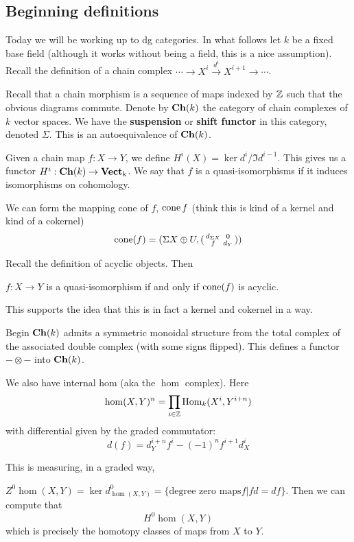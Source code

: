\documentclass[12pt]{article}
\begin{document}
\subsection{Beginning definitions}

Today we will be working up to dg categories. In what follows let $k$ be a fixed base field (although it works without being a field, this 
is a nice assumption). Recall the definition of a chain complex $\cdots\to X^i\xrightarrow{d^i} X^{i+1}\to\cdots$.

Recall that a chain morphism is a sequence of maps indexed by $\mathbb{Z}$ such that the obvious diagrams commute. Denote by $\operatorname{\mathbf{Ch}}(k)$ the category of chain complexes of $k$
vector spaces. We have the \textbf{suspension} or \textbf{shift functor} in this category, denoted $\Sigma$. This is an autoequivalence of $\operatorname{\mathbf{Ch}}(k)$.

Given a chain map $f:X\to Y$, we define $H^i(X)=\ker d^i/\Im d^{i-1}$. This gives us a functor $H^i:\operatorname{\mathbf{Ch}}(k)\to \operatorname{\mathbf{Vect}_k}$. We say that $f$ is a quasi-isomorphisms if it induces
isomorphisms on cohomology.

We can form the mapping cone of $f$, $\operatorname{cone} f$ (think this is kind of a kernel and kind of a cokernel)
\[\operatorname{cone}(f)=(\Sigma X\oplus U,(\begin{smallmatrix}d_{\Sigma X} & 0\\ f & d_Y\end{smallmatrix}))\]

Recall the definition of acyclic objects. Then 
\begin{lem}
	$f:X\to Y$ is a quasi-isomorphism if and only if $\operatorname{cone}(f)$ is acyclic.
\end{lem}
\begin{rmk}
	This supports the idea that this is in fact a kernel and cokernel in a way.
\end{rmk}

Begin $\operatorname{\mathbf{Ch}}(k)$ admits a symmetric monoidal structure from the total complex of the associated double 
complex (with some signs flipped). This defines a functor $-\otimes -$ into $\operatorname{\mathbf{Ch}}(k)$.

We also have internal hom (aka the $\hom$ complex). Here 
\[\operatorname{hom}(X,Y)^n=\prod_{i\in\mathbb{Z}}\operatorname{Hom}_k(X^i,Y^{i+n})\]
with differential given by the graded commutator:
\[d(f)=d_Y^{i+n} f^i-(-1)^nf^{i+1}d_X^i\]

\begin{rmk}
	This is measuring, in a graded way, 
\end{rmk}
\begin{ex}
	$Z^0\hom(X,Y)=\ker d^0_{\hom(X,Y)}=\{\text{degree zero maps} f| fd=df\}$. Then we can compute that 
	\[H^0\hom(X,Y)\]
	which is precisely the homotopy classes of maps from $X$ to $Y$.
\end{ex}
\end{document}
